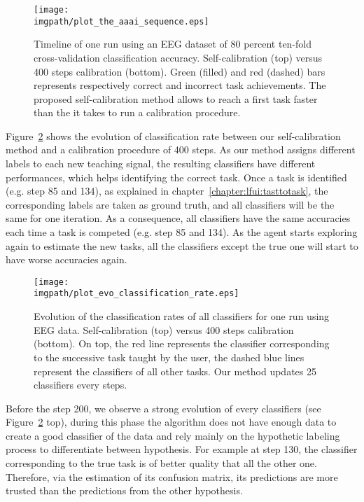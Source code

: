 
\begin{figure}[!htbp]
\centering
\texttt{[image: \\imgpath/plot\_the\_aaai\_sequence.eps]}
\caption{Timeline of one run using an EEG dataset of $80$ percent ten-fold cross-validation classification accuracy. Self-calibration (top) versus 400 steps calibration (bottom). Green (filled) and red (dashed) bars represents respectively correct and incorrect task achievements. The proposed self-calibration method allows to reach a first task faster than the it takes to run a calibration procedure.}
\label{fig:sequence}
\end{figure} 

Figure~\ref{fig:sequence_evolution} shows the evolution of classification rate between our self-calibration method and a calibration procedure of 400 steps. As our method assigns different labels to each new teaching signal, the resulting classifiers have different performances, which helps identifying the correct task. Once a task is identified (e.g. step 85 and 134), as explained in chapter~\ref{chapter:lfui:tasttotask}, the corresponding labels are taken as ground truth, and all classifiers will be the same for one iteration. As a consequence, all classifiers have the same accuracies each time a task is competed (e.g. step 85 and 134). As the agent starts exploring again to estimate the new tasks, all the classifiers except the true one will start to have worse accuracies again.

\begin{figure}[!htbp]
\centering
\texttt{[image: \\imgpath/plot\_evo\_classification\_rate.eps]}
\caption{Evolution of the classification rates of all classifiers for one run using EEG data. Self-calibration (top) versus 400 steps calibration (bottom). On top, the red line represents the classifier corresponding to the successive task taught by the user, the dashed blue lines represent the classifiers of all other tasks. Our method updates 25 classifiers every steps.}
\label{fig:sequence_evolution}
\end{figure}

Before the step 200, we observe a strong evolution of every classifiers (see Figure~\ref{fig:sequence_evolution} top), during this phase the algorithm does not have enough data to create a good classifier of the data and rely mainly on the hypothetic labeling process to differentiate between hypothesis. For example at step 130, the classifier corresponding to the true task is of better quality that all the other one. Therefore, via the estimation of its confusion matrix, its predictions are more trusted than the predictions from the other hypothesis.

